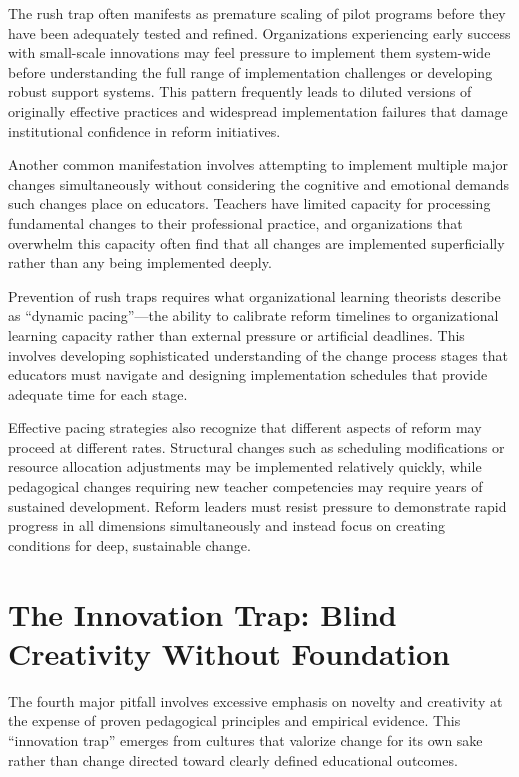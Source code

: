 \documentclass[
  Letterpaper,
]{scrbook}
\begin{document}
The rush trap often manifests as premature scaling of pilot programs
before they have been adequately tested and refined. Organizations
experiencing early success with small-scale innovations may feel
pressure to implement them system-wide before understanding the full
range of implementation challenges or developing robust support systems.
This pattern frequently leads to diluted versions of originally
effective practices and widespread implementation failures that damage
institutional confidence in reform initiatives.

Another common manifestation involves attempting to implement multiple
major changes simultaneously without considering the cognitive and
emotional demands such changes place on educators. Teachers have limited
capacity for processing fundamental changes to their professional
practice, and organizations that overwhelm this capacity often find that
all changes are implemented superficially rather than any being
implemented deeply.

Prevention of rush traps requires what organizational learning theorists
describe as ``dynamic pacing''---the ability to calibrate reform
timelines to organizational learning capacity rather than external
pressure or artificial deadlines. This involves developing sophisticated
understanding of the change process stages that educators must navigate
and designing implementation schedules that provide adequate time for
each stage.

Effective pacing strategies also recognize that different aspects of
reform may proceed at different rates. Structural changes such as
scheduling modifications or resource allocation adjustments may be
implemented relatively quickly, while pedagogical changes requiring new
teacher competencies may require years of sustained development. Reform
leaders must resist pressure to demonstrate rapid progress in all
dimensions simultaneously and instead focus on creating conditions for
deep, sustainable change.

\section{The Innovation Trap: Blind Creativity Without
Foundation}\label{the-innovation-trap-blind-creativity-without-foundation}

The fourth major pitfall involves excessive emphasis on novelty and
creativity at the expense of proven pedagogical principles and empirical
evidence. This ``innovation trap'' emerges from cultures that valorize
change for its own sake rather than change directed toward clearly
defined educational outcomes.
\end{document}
